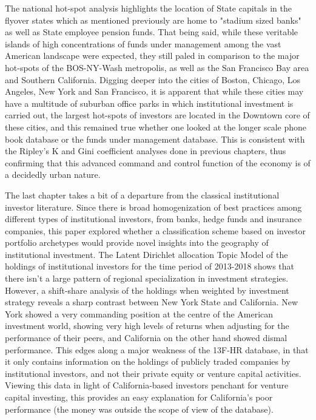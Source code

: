 The national hot-spot analysis highlights the location of State capitals in the flyover states which as mentioned previously are home to "stadium sized banks" as well as State employee pension funds.  That being said, while these veritable islands of high concentrations of funds under management among the vast American landscape were expected, they still paled in comparison to the major hot-spots of the BOS-NY-Wash metropolis, as well as the San Francisco Bay area and Southern California.   Digging deeper into the cities of Boston, Chicago, Los Angeles, New York and San Francisco, it is apparent that while these cities may have a multitude of suburban office parks in which institutional investment is carried out, the largest hot-spots of investors are located in the Downtown core of these cities, and this remained true whether one looked at the longer scale phone book database or the funds under management database.  This is consistent with the Ripley's K and Gini coefficient analyses done in previous chapters, thus confirming that this advanced command and control function of the economy is of a decidedly urban nature.  
     
The last chapter takes a bit of a departure from the classical institutional investor literature.  Since there is broad homogenization of best practices among different types of institutional investors, from banks, hedge funds and insurance companies, this paper explored whether a classification scheme based on investor portfolio archetypes would provide novel insights into the geography of institutional investment.  The Latent Dirichlet allocation Topic Model of the holdings of institutional investors for the time period of 2013-2018 shows that there isn't a large pattern of regional specialization in investment strategies.  However, a shift-share analysis of the holdings when weighted by investment strategy reveals a sharp contrast between New York State and California.  New York showed a very commanding position at the centre of the American investment world, showing very high levels of returns when adjusting for the performance of their peers, and California on the other hand showed dismal performance.  This edges along a major weakness of the 13F-HR database, in that it only contains information on the holdings of publicly traded companies by institutional investors, and not their private equity or venture capital activities.  Viewing this data in light of California-based investors penchant for venture capital investing, this provides an easy explanation for California's poor performance (the money was outside the scope of view of the database). 

